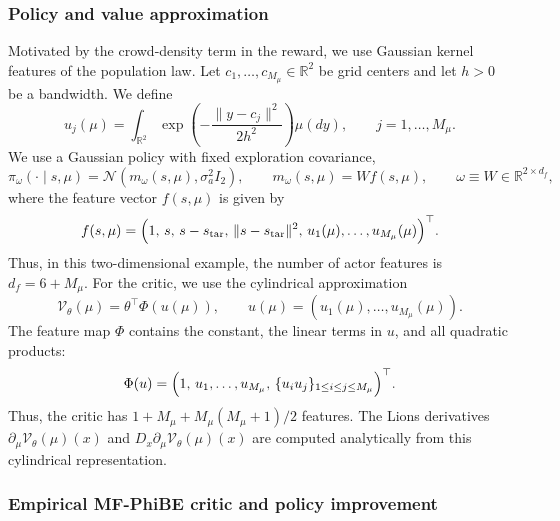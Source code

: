 \documentclass[a4paper, 10pt, english, reqno]{amsart}
\begin{document}
\subsubsection{Policy and value approximation}
\label{subsec:crowd-policy-critic}

Motivated by the crowd-density term in the reward, we use Gaussian kernel features of the population law. Let $c_1,\ldots,c_{M_\mu}\in\mathbb R^2$ be grid centers and let $h>0$ be a bandwidth. We define
\[
u_j(\mu)
=
\int_{\mathbb R^2}
\exp\left(-\frac{\|y-c_j\|^2}{2h^2}\right)\mu(dy),
\qquad
j=1,\ldots,M_\mu.
\]
We use a Gaussian policy with fixed exploration covariance,
\[
\pi_\omega(\cdot\mid s,\mu)
=
\mathcal N\left(m_\omega(s,\mu),\sigma_a^2 I_2\right),
\qquad
m_\omega(s,\mu)=W f(s,\mu),
\qquad
\omega\equiv W\in\mathbb R^{2\times d_f},
\]
where the feature vector $f(s,\mu)$ is given by
\[
f(s,\mu)
=
\Bigl(
1,\,
s,\,
s-s_{\rm tar},\,
\|s-s_{\rm tar}\|^2,\,
u_1(\mu),\ldots,u_{M_\mu}(\mu)
\Bigr)^\top .
\]
Thus, in this two-dimensional example, the number of actor features is $d_f=6+M_\mu$. For the critic, we use the cylindrical approximation
\[
\mathcal V_\theta(\mu)=\theta^\top \Phi(u(\mu)),
\qquad
u(\mu)=(u_1(\mu),\ldots,u_{M_\mu}(\mu)).
\]
The feature map $\Phi$ contains the constant, the linear terms in $u$, and all quadratic products:
\[
\Phi(u)
=
\Bigl(
1,\,
u_1,\ldots,u_{M_\mu},\,
\{u_i u_j\}_{1\leq i\leq j\leq M_\mu}
\Bigr)^\top .
\]
Thus, the critic has $1+M_\mu+M_\mu(M_\mu+1)/2$ features. The Lions derivatives $\partial_\mu \mathcal V_\theta(\mu)(x)$ and $D_x\partial_\mu \mathcal V_\theta(\mu)(x)$ are computed analytically from this cylindrical representation.

\subsubsection{Empirical MF-PhiBE critic and policy improvement}
\label{subsec:crowd-law-critic}
\end{document}
